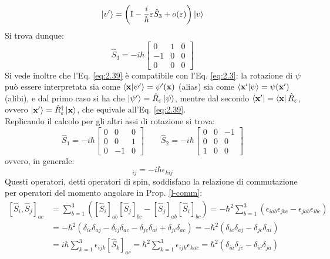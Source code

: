\begin{equation}
	\ket{v'} = \left( \mathbf{\text{I}} - \frac{i}{\hbar} \varepsilon \hat{S}_3 + o(\varepsilon) \right) \ket{v}
	\label{eq:2.39}
\end{equation}
Si trova dunque:
\begin{equation}
	\hat{S}_3 = -i\hbar
	\begin{bmatrix}
		0 & 1 & 0 \\
		-1 & 0 & 0 \\
		0 & 0 & 0
	\end{bmatrix}
	\label{eq:2.40}
\end{equation}
Si vede inoltre che l'Eq. \ref{eq:2.39} è compatibile con l'Eq. \ref{eq:2.3}: la rotazione di $ \psi $ può essere interpretata sia come $ \braket{\mathbf{x} | \psi'} = \psi'(\mathbf{x}) $ (alias) sia come $ \braket{\mathbf{x}' | \psi} = \psi(\mathbf{x}') $ (alibi), e dal primo caso si ha che $ \ket{\psi'} = \hat{R}_{\varepsilon} \ket{\psi} $, mentre dal secondo $ \bra{\mathbf{x}'} = \bra{\mathbf{x}} \hat{R}_{\varepsilon} $, ovvero $ \ket{\mathbf{x}'} = \hat{R}_{\varepsilon}^{\dagger} \ket{\mathbf{x}} $, che equivale all'Eq. \ref{eq:2.39}.\\
Replicando il calcolo per gli altri assi di rotazione si trova:
\begin{equation}
	\hat{S}_1 = -i\hbar
	\begin{bmatrix}
		0 & 0 & 0 \\
		0 & 0 & 1 \\
		0 & -1 & 0
	\end{bmatrix}
	\qquad
	\hat{S}_2 = -i\hbar
	\begin{bmatrix}
		0 & 0 & -1 \\
		0 & 0 & 0 \\
		1 & 0 & 0
	\end{bmatrix}
	\label{eq:2.41}
\end{equation}
ovvero, in generale:
\begin{equation}
	[\hat{S}_k]_{ij} = -i\hbar \epsilon_{kij}
	\label{eq:2.42}
\end{equation}
Questi operatori, detti operatori di spin, soddisfano la relazione di commutazione per operatori del momento angolare in Prop. \ref{l-comm}:
\begin{equation*}
	\begin{split}
		[\hat{S}_i,\hat{S}_j]_{ac}
		&= \sum_{b = 1}^{3} \left( [\hat{S}_i]_{ab} [\hat{S}_j]_{bc} - [\hat{S}_j]_{ab} [\hat{S}_i]_{bc} \right) = -\hbar^2 \sum_{b = 1}^{3} \left( \epsilon_{iab} \epsilon_{jbc} - \epsilon_{jab} \epsilon_{ibc} \right)\\
		&= -\hbar^2 \left( \delta_{ic}\delta_{aj} - \delta_{ij}\delta_{ac} - \delta_{jc} \delta_{ai} + \delta_{ji} \delta_{ac} \right) = -\hbar^2 \left( \delta_{ic} \delta_{aj} - \delta_{jc} \delta_{ai} \right)\\
		&= i\hbar \sum_{k = 1}^{3} \epsilon_{ijk} [\hat{S}_k]_{ac} = \hbar^2 \sum_{k = 1}^{3} \epsilon_{ijk} \epsilon_{kac} = \hbar^2 \left( \delta_{ia}\delta_{jc} - \delta_{ic}\delta_{ja} \right)
	\end{split}
\end{equation*}
